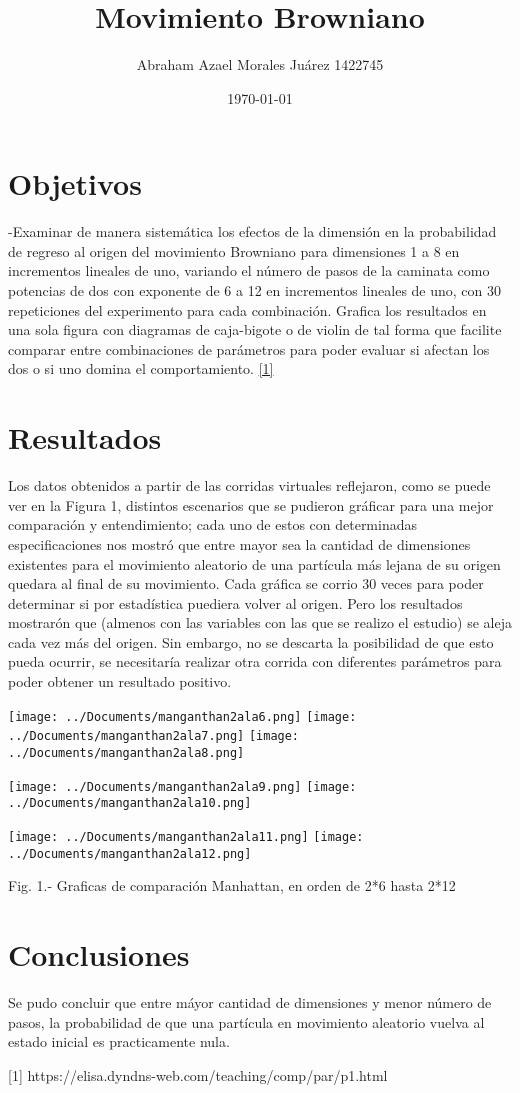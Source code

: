 \documentclass{article}
\author{Abraham Azael Morales Juárez        1422745}
\title{Movimiento Browniano}
\date{\today}
\begin{document}
\maketitle

\section{Objetivos}
-Examinar de manera sistemática los efectos de la dimensión en la probabilidad de regreso al origen del movimiento Browniano para dimensiones 1 a 8 en incrementos lineales de uno, variando el número de pasos de la caminata como potencias de dos con exponente de 6 a 12 en       incrementos lineales de uno, con 30 repeticiones del experimento para cada combinación. Grafica los resultados en una sola figura con diagramas de caja-bigote o de violin de tal forma que facilite comparar entre combinaciones de parámetros para poder evaluar si afectan los dos  o si uno domina el comportamiento. \url{[1]}

\section{Resultados}
Los datos obtenidos a partir de las corridas virtuales reflejaron, como se puede ver en la Figura 1, distintos escenarios que se pudieron gráficar para una mejor comparación y entendimiento; cada uno de estos con determinadas especificaciones nos mostró que entre mayor sea la cantidad de dimensiones existentes para el movimiento aleatorio de una partícula más lejana de su origen quedara al final de su movimiento. Cada gráfica se corrio 30 veces para poder determinar si por estadística puediera volver al origen. Pero los resultados mostrarón que (almenos con las variables con las que se realizo el estudio) se aleja cada vez más del origen. Sin embargo, no se descarta la posibilidad de que esto pueda ocurrir, se necesitaría realizar otra corrida con diferentes parámetros para poder obtener un resultado positivo.

\texttt{[image: ../Documents/manganthan2ala6.png]}  \texttt{[image: ../Documents/manganthan2ala7.png]} \texttt{[image: ../Documents/manganthan2ala8.png]} 

\texttt{[image: ../Documents/manganthan2ala9.png]} \texttt{[image: ../Documents/manganthan2ala10.png]} 


\texttt{[image: ../Documents/manganthan2ala11.png]}  \texttt{[image: ../Documents/manganthan2ala12.png]} 

{Fig. 1.- Graficas de comparación Manhattan, en orden de 2*6 hasta 2*12}

\section{Conclusiones}
Se pudo concluir que entre máyor cantidad de dimensiones y menor número de pasos, la probabilidad de que una partícula en movimiento aleatorio vuelva al estado inicial es practicamente nula.



{[1] https://elisa.dyndns-web.com/teaching/comp/par/p1.html}
\end{document}
